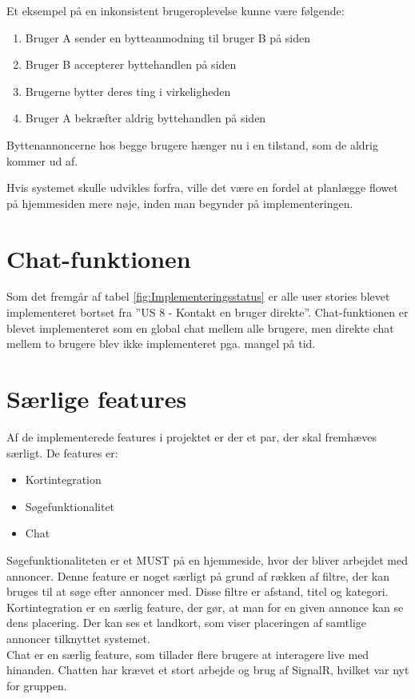 \noindent Et eksempel på en inkonsistent brugeroplevelse kunne være følgende:
\begin{enumerate}
	\item Bruger A sender en bytteanmodning til bruger B på siden
	\item Bruger B accepterer byttehandlen på siden
	\item Brugerne bytter deres ting i virkeligheden
	\item Bruger A bekræfter aldrig byttehandlen på siden
\end{enumerate}
\noindent Byttenannoncerne hos begge brugere hænger nu i en tilstand, som de aldrig kommer ud af.

\noindent Hvis systemet skulle udvikles forfra, ville det være en fordel at planlægge flowet på hjemmesiden mere nøje, inden man begynder på implementeringen.

\section{Chat-funktionen}
Som det fremgår af tabel \ref{fig:Implementeringsstatus} er alle user stories blevet implementeret bortset fra ''US 8 - Kontakt en bruger direkte''. Chat-funktionen er blevet implementeret som en global chat mellem alle brugere, men direkte chat mellem to brugere blev ikke implementeret pga. mangel på tid.

	
\section{Særlige features}
Af de implementerede features i projektet er der et par, der skal fremhæves særligt.
De features er:
\begin{itemize}[noitemsep]
	\item Kortintegration
	\item Søgefunktionalitet 
	\item Chat
\end{itemize}

\noindent Søgefunktionaliteten er et MUST på en hjemmeside, hvor der bliver arbejdet med annoncer. Denne feature er noget særligt på grund af rækken af filtre, der kan bruges til at søge efter annoncer med. Disse filtre er afstand, titel og kategori. \\

\noindent Kortintegration er en særlig feature, der gør, at man for en given annonce kan se dens placering. Der kan ses et landkort, som viser placeringen af samtlige annoncer tilknyttet systemet. \\

\noindent Chat er en særlig feature, som tillader flere brugere at interagere live med hinanden. Chatten har krævet et stort arbejde og brug af SignalR, hvilket var nyt for gruppen.




 